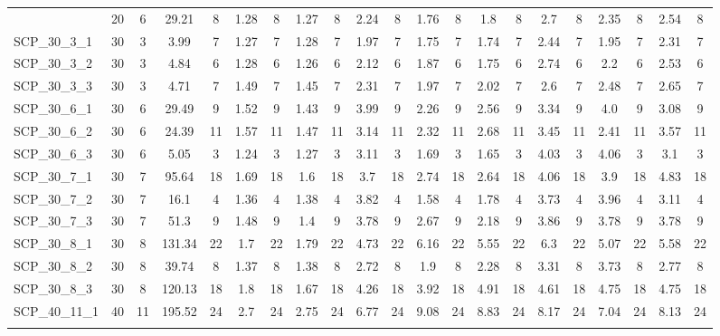\begin{sidewaystable}[!ht]
{\begin{tabular}{lcccccccccccccccccccc}
{SCP\_20\_6\_3 & 20 & 6 & 29.21 & 8 & 1.28 & 8 &  \textcolor{blue2}{1.27} & 8 & 2.24 & 8 & 1.76 & 8 & 1.8 & 8 & 2.7 & 8 & 2.35 & 8 & 2.54 & 8 \\
SCP\_30\_3\_1 & 30 & 3 & 3.99 & 7 &  \textcolor{blue2}{1.27} & 7 & 1.28 & 7 & 1.97 & 7 & 1.75 & 7 & 1.74 & 7 & 2.44 & 7 & 1.95 & 7 & 2.31 & 7 \\
SCP\_30\_3\_2 & 30 & 3 & 4.84 & 6 & 1.28 & 6 &  \textcolor{blue2}{1.26} & 6 & 2.12 & 6 & 1.87 & 6 & 1.75 & 6 & 2.74 & 6 & 2.2 & 6 & 2.53 & 6 \\
SCP\_30\_3\_3 & 30 & 3 & 4.71 & 7 & 1.49 & 7 &  \textcolor{blue2}{1.45} & 7 & 2.31 & 7 & 1.97 & 7 & 2.02 & 7 & 2.6 & 7 & 2.48 & 7 & 2.65 & 7 \\
SCP\_30\_6\_1 & 30 & 6 & 29.49 & 9 & 1.52 & 9 &  \textcolor{blue2}{1.43} & 9 & 3.99 & 9 & 2.26 & 9 & 2.56 & 9 & 3.34 & 9 & 4.0 & 9 & 3.08 & 9 \\
SCP\_30\_6\_2 & 30 & 6 & 24.39 & 11 & 1.57 & 11 &  \textcolor{blue2}{1.47} & 11 & 3.14 & 11 & 2.32 & 11 & 2.68 & 11 & 3.45 & 11 & 2.41 & 11 & 3.57 & 11 \\
SCP\_30\_6\_3 & 30 & 6 & 5.05 & 3 &  \textcolor{blue2}{1.24} & 3 & 1.27 & 3 & 3.11 & 3 & 1.69 & 3 & 1.65 & 3 & 4.03 & 3 & 4.06 & 3 & 3.1 & 3 \\
SCP\_30\_7\_1 & 30 & 7 & 95.64 & 18 & 1.69 & 18 &  \textcolor{blue2}{1.6} & 18 & 3.7 & 18 & 2.74 & 18 & 2.64 & 18 & 4.06 & 18 & 3.9 & 18 & 4.83 & 18 \\
SCP\_30\_7\_2 & 30 & 7 & 16.1 & 4 &  \textcolor{blue2}{1.36} & 4 & 1.38 & 4 & 3.82 & 4 & 1.58 & 4 & 1.78 & 4 & 3.73 & 4 & 3.96 & 4 & 3.11 & 4 \\
SCP\_30\_7\_3 & 30 & 7 & 51.3 & 9 & 1.48 & 9 &  \textcolor{blue2}{1.4} & 9 & 3.78 & 9 & 2.67 & 9 & 2.18 & 9 & 3.86 & 9 & 3.78 & 9 & 3.78 & 9 \\
SCP\_30\_8\_1 & 30 & 8 & 131.34 & 22 &  \textcolor{blue2}{1.7} & 22 & 1.79 & 22 & 4.73 & 22 & 6.16 & 22 & 5.55 & 22 & 6.3 & 22 & 5.07 & 22 & 5.58 & 22 \\
SCP\_30\_8\_2 & 30 & 8 & 39.74 & 8 &  \textcolor{blue2}{1.37} & 8 & 1.38 & 8 & 2.72 & 8 & 1.9 & 8 & 2.28 & 8 & 3.31 & 8 & 3.73 & 8 & 2.77 & 8 \\
SCP\_30\_8\_3 & 30 & 8 & 120.13 & 18 & 1.8 & 18 &  \textcolor{blue2}{1.67} & 18 & 4.26 & 18 & 3.92 & 18 & 4.91 & 18 & 4.61 & 18 & 4.75 & 18 & 4.75 & 18 \\
SCP\_40\_11\_1 & 40 & 11 & 195.52 & 24 &  \textcolor{blue2}{2.7} & 24 & 2.75 & 24 & 6.77 & 24 & 9.08 & 24 & 8.83 & 24 & 8.17 & 24 & 7.04 & 24 & 8.13 & 24 \\
}
\end{tabular}}
\end{sidewaystable}
